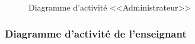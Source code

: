 \documentclass[12pt]{report}
\begin{document}
\vspace{0.3in}

\begin{figure}[h]
\centering
    \centerline{}
    \caption{Diagramme d'activité <<Administrateur>>}
\end{figure}

\newpage

\subsubsection{Diagramme d'activité de l'enseignant}

\vspace{0.3in}
\end{document}
